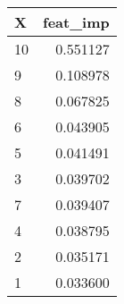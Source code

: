 \begin{tabular}{lr}
\toprule
 X &  feat\_imp \\
\midrule
10 &  0.551127 \\
 9 &  0.108978 \\
 8 &  0.067825 \\
 6 &  0.043905 \\
 5 &  0.041491 \\
 3 &  0.039702 \\
 7 &  0.039407 \\
 4 &  0.038795 \\
 2 &  0.035171 \\
 1 &  0.033600 \\
\bottomrule
\end{tabular}
